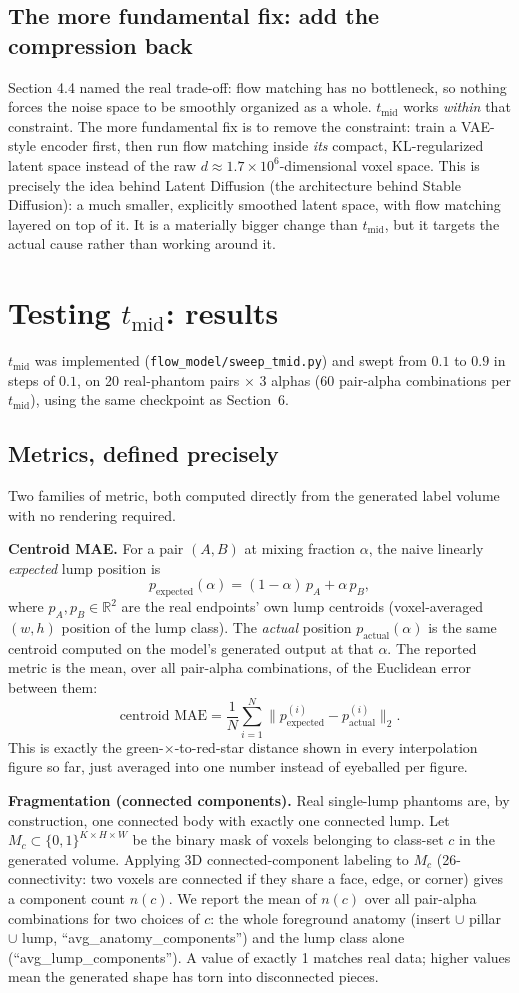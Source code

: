 \documentclass[11pt]{article}
\newcommand{\hsec}[1]{\section*{\color{hdrblue}#1}}
\newcommand{\hsub}[1]{\subsection*{#1}}
\begin{document}
\hsub{The more fundamental fix: add the compression back}
Section 4.4 named the real trade-off: flow matching has no bottleneck, so nothing forces the
noise space to be smoothly organized as a whole. $t_{\text{mid}}$ works \emph{within} that
constraint. The more fundamental fix is to remove the constraint: train a VAE-style encoder
first, then run flow matching inside \emph{its} compact, KL-regularized latent space instead
of the raw $d\approx 1.7\times10^6$-dimensional voxel space. This is precisely the idea behind
Latent Diffusion (the architecture behind Stable Diffusion): a much smaller, explicitly
smoothed latent space, with flow matching layered on top of it. It is a materially bigger
change than $t_{\text{mid}}$, but it targets the actual cause rather than working around it.

\hsec{Testing $t_{\text{mid}}$: results}
$t_{\text{mid}}$ was implemented (\texttt{flow\_model/sweep\_tmid.py}) and swept from $0.1$ to
$0.9$ in steps of $0.1$, on 20 real-phantom pairs $\times$ 3 alphas ($60$ pair-alpha
combinations per $t_{\text{mid}}$), using the same checkpoint as Section~6.

\hsub{Metrics, defined precisely}
Two families of metric, both computed directly from the generated label volume with no
rendering required.

\textbf{Centroid MAE.} For a pair $(A,B)$ at mixing fraction $\alpha$, the naive linearly
\emph{expected} lump position is
\begin{equation}
p_{\text{expected}}(\alpha) = (1-\alpha)\, p_A + \alpha\, p_B,
\end{equation}
where $p_A, p_B \in \mathbb{R}^2$ are the real endpoints' own lump centroids (voxel-averaged
$(w,h)$ position of the lump class). The \emph{actual} position $p_{\text{actual}}(\alpha)$ is
the same centroid computed on the model's generated output at that $\alpha$. The reported
metric is the mean, over all pair-alpha combinations, of the Euclidean error between them:
\begin{equation}
\text{centroid MAE} = \frac{1}{N}\sum_{i=1}^{N} \big\| p_{\text{expected}}^{(i)} - p_{\text{actual}}^{(i)} \big\|_2 .
\end{equation}
This is exactly the green-$\times$-to-red-star distance shown in every interpolation figure
so far, just averaged into one number instead of eyeballed per figure.

\textbf{Fragmentation (connected components).} Real single-lump phantoms are, by construction,
one connected body with exactly one connected lump. Let $M_c \subset \{0,1\}^{K\times H\times W}$
be the binary mask of voxels belonging to class-set $c$ in the generated volume. Applying
3D connected-component labeling to $M_c$ (26-connectivity: two voxels are connected if they
share a face, edge, or corner) gives a component count $n(c)$. We report the mean of $n(c)$
over all pair-alpha combinations for two choices of $c$: the whole foreground anatomy
(insert $\cup$ pillar $\cup$ lump, ``avg\_anatomy\_components'') and the lump class alone
(``avg\_lump\_components''). A value of exactly 1 matches real data; higher values mean the
generated shape has torn into disconnected pieces.
\end{document}
